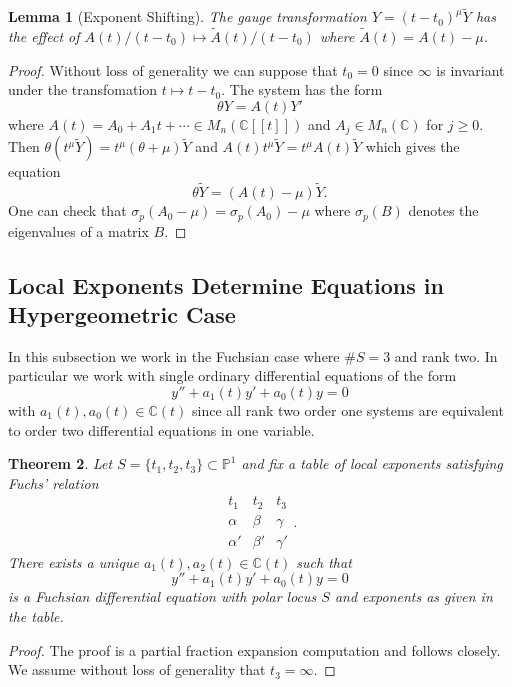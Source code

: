 \documentclass[12pt]{book}
\numberwithin{equation}{section}
\newtheorem{theorem}{Theorem}[subsection]
\newtheorem{lemma}[theorem]{Lemma}
\theoremstyle{definition}
\theoremstyle{remark}
\newcommand{\CC}{\mathbb{C}}
\newcommand{\PP}{\mathbb{P}}
\begin{document}
\begin{lemma}[Exponent Shifting]\label{L:exponent-shifting}
	The gauge transformation $Y=(t-t_0)^{\mu}\widetilde{Y}$ has the effect of $A(t)/(t-t_0)\mapsto \widetilde{A}(t)/(t-t_0)$ where $\widetilde{A}(t) = A(t)-\mu$.
\end{lemma}
\begin{proof}
	Without loss of generality we can suppose that $t_0=0$ since $\infty$ is invariant under the transfomation $t\mapsto t-t_0$. 
	The system has the form 
	 $$ \theta Y = A(t) Y' $$
	where $A(t) = A_0 + A_1 t + \cdots \in M_n(\CC[[t]])$ and $A_j \in M_n(\CC)$ for $j\geq 0$. 
	Then $\theta(t^{\mu}\widetilde{Y}) = t^{\mu}(\theta+\mu)\widetilde{Y}$ and $A(t)t^{\mu}\widetilde{Y} = t^{\mu}A(t)\widetilde{Y}$ which gives the equation
	 $$ \theta \widetilde{Y} = (A(t)-\mu) \widetilde{Y}.$$
	One can check that $\sigma_p(A_0-\mu) = \sigma_p(A_0)-\mu$ where $\sigma_p(B)$ denotes the eigenvalues of a matrix $B$.
\end{proof}

\subsection[Exponents Determine Equations]{Local Exponents Determine Equations in Hypergeometric Case}
In this subsection we work in the Fuchsian case where $\#S=3$ and rank two. 
In particular we work with single ordinary differential equations of the form
 $$ y'' + a_1(t)y' + a_0(t) y =0 $$
with $a_1(t),a_0(t) \in \CC(t)$ since all rank two order one systems are equivalent to order two differential equations in one variable.

\begin{theorem}\label{T:exponents-determine-equation}
Let $S = \lbrace t_1,t_2,t_3 \rbrace \subset \PP^1$ and fix a table of local exponents satisfying Fuchs' relation  
$$\begin{array}{ccc}
t_1& t_2 & t_3 \\
\hline \hline \alpha & \beta & \gamma \\
\alpha' & \beta' & \gamma' 
\end{array}.$$
There exists a unique $a_1(t),a_2(t) \in \CC(t)$ such that 
\begin{equation}\label{E:fixed-exponents}
  y''+a_1(t) y' + a_0(t) y =0
 \end{equation}
is a Fuchsian differential equation with polar locus $S$ and exponents as given in the table. 
\end{theorem}
\begin{proof}
	The proof is a partial fraction expansion computation and follows \cite[Chapter 2, Proposition 1.1.1]{Iwasaki1991} closely.
	We assume without loss of generality that $t_3=\infty$. 
\end{proof}
\end{document}
